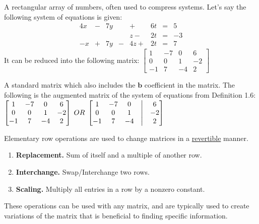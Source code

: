 \documentclass{report}
\begin{document}
\begin{definition}[Matrix]
A rectangular array of numbers, often used to compress systems. Let's say the following system of equations is given:
\begin{alignat*}{4}
 x & {}-{} & 7y & {} {} &    {}+{} & 6t & {}={} &  5 \\
   & {} {} &    & {} {} &  z {}-{} & 2t & {}={} & -3 \\
-x & {}+{} & 7y & {}-{} & 4z {}+{} & 2t & {}={} &  7
\end{alignat*}
It can be reduced into the following matrix:
$\begin{bmatrix}
1 & -7 & 0 & 6 \\ 
0 & 0 & 1 & -2 \\ 
-1 & 7 & -4 & 2
\end{bmatrix}$
\end{definition}
\begin{definition}
A standard matrix which also includes the $\mathbf{b}$ coefficient in the matrix. The following is the augmented matrix of the system of equations from Definition 1.6:
$\begin{bmatrix}
1 & -7 & 0 & 6 \\ 
0 & 0 & 1 & -2 \\ 
-1 & 7 & -4 & 2
\end{bmatrix}
\;OR\;
\begin{bmatrix}
1 & -7 & 0 &\bigm| & 6 \\ 
0 & 0 & 1 &\bigm| & -2 \\ 
-1 & 7 & -4 &\bigm| & 2
\end{bmatrix}$
\end{definition}
\begin{definition}
Elementary row operations are used to change matrices in a \underline{revertible} manner.
	\begin{enumerate}
		\item \textbf{Replacement.} Sum of itself and a multiple of another row.
		\item \textbf{Interchange.} Swap/Interchange two rows.
		\item \textbf{Scaling.} Multiply all entries in a row by a nonzero constant.
	\end{enumerate}
\end{definition}

These operations can be used with any matrix, and are typically used to create variations of the matrix that is beneficial to finding specific information.
\end{document}
